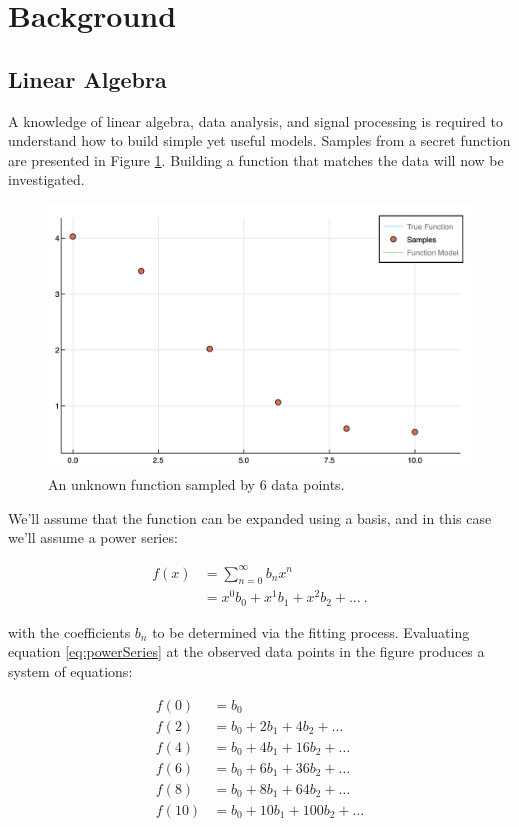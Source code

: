 \section{Background}\label{Sect:background}
\subsection{Linear Algebra}\label{Sect:linearAlgebra}
A knowledge of linear algebra, data analysis, and signal processing is required to understand how to build simple yet useful models. Samples from a secret function are presented in Figure \ref{fig:func1Samples}. Building a function that matches the data will now be investigated.

\begin{figure}[h]
\includegraphics[scale = 0.4]{Figures/func1Samples}
\caption{An unknown function sampled by 6 data points.
\label{fig:func1Samples}} 
\end{figure}

\par We'll assume that the function can be expanded using a basis, and in this case we'll assume a power series:

\begin{align}
f(x) &= \sum_{n=0}^\infty b_n x^n
	\label{eq:powerSum}\\ 
&= x^0b_0 + x^1b_1 + x^2b_2 + \ldots\ .
	\label{eq:powerSeries}
\end{align}

with the coefficients $b_n$ to be determined via the fitting process.  Evaluating equation \ref{eq:powerSeries} at the observed data points in the figure produces a system of equations:

\begin{align*}
f(0) &= b_0\\
f(2) &= b_0 + 2 b_1 + 4 b_2 + \dots\\
f(4) &= b_0 + 4 b_1 + 16 b_2 + \dots\\
f(6) &= b_0 + 6 b_1 + 36 b_2 + \dots\\
f(8) &= b_0 + 8 b_1 + 64 b_2 + \dots\\
f(10) &= b_0 + 10 b_1 + 100 b_2 + \dots\\
\end{align*}


